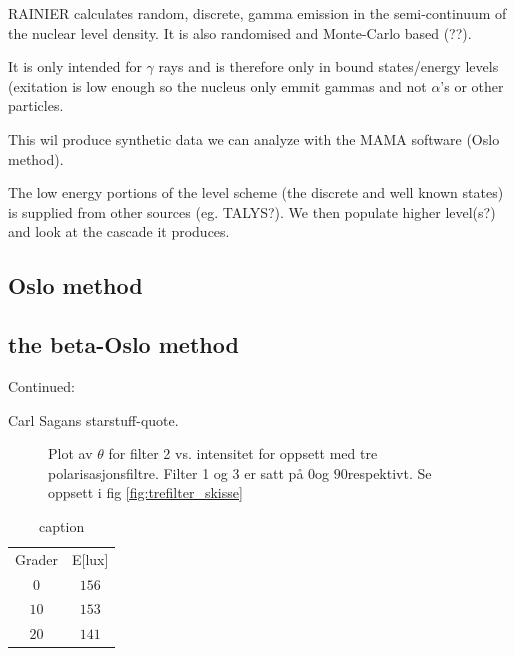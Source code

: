 \documentclass[%
 reprint,
 amsmath,amssymb,
 aps,
 norsk
]{revtex4-1}
\begin{document}
RAINIER calculates random, discrete, gamma emission in the semi-continuum of the nuclear level density. It is also randomised and Monte-Carlo based (??). 

It is only intended for $\gamma$ rays and is therefore only in bound states/energy levels (exitation is low enough so the nucleus only emmit gammas and not $\alpha$'s or other particles. 

This wil produce synthetic data we can analyze with the MAMA software (Oslo method).


The low energy portions of the level scheme (the discrete and well known states) is supplied from other sources (eg. TALYS?). We then populate higher level(s?) and look at the cascade it produces. 

\subsection{Oslo method}



\subsection{the beta-Oslo method}

Continued:

Carl Sagans starstuff-quote.

















\begin{figure}
	\caption{Plot av $\theta$ for filter 2 vs. intensitet for oppsett med tre polarisasjonsfiltre. Filter 1 og 3 er satt på $0$\textdegree og $90$\textdegree respektivt. Se oppsett i fig \ref{fig:trefilter_skisse} \label{fig:plot_trefilter}}
\end{figure}


\begin{table}
	\centering
	\begin{tabular}{ c c } 		
	Grader & E[lux] \\
	$0$\textdegree  & $156$ \\
	$10$\textdegree & $153$ \\
	$20$\textdegree & $141$ \\
	\end{tabular}
	\caption{caption \label{tab:II_twofilters}}
\end{table}
\end{document}
